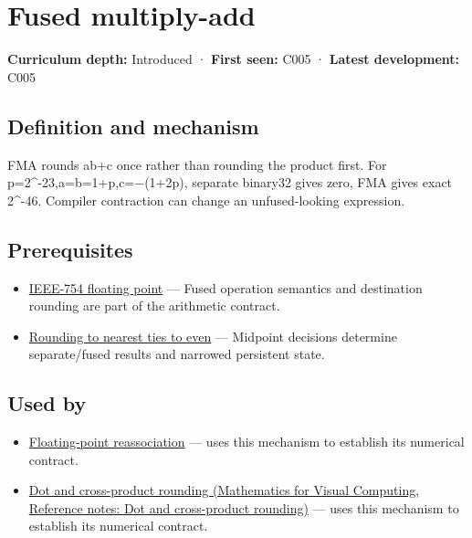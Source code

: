\hypertarget{appendix-41e8ef22a21e}{}\label{referencestart:appendix-41e8ef22a21e}
\section{Fused multiply-add}\label{appendix-41e8ef22a21e-fused-multiply-add}

\textbf{Curriculum depth:} Introduced · \textbf{First seen:} C005 · \textbf{Latest development:} C005

\subsection{Definition and mechanism}\label{appendix-41e8ef22a21e-definition-and-mechanism}

FMA rounds ab+c once rather than rounding the product first. For p=2\^{}-23,a=b=1+p,c=−(1+2p), separate binary32 gives zero, FMA gives exact 2\^{}-46. Compiler contraction can change an unfused-looking expression.

\subsection{Prerequisites}\label{appendix-41e8ef22a21e-prerequisites}

\begin{itemize}
\tightlist
\item
  \hyperref[appendix-343615f49ddf]{IEEE-754 floating point} --- Fused operation semantics and destination rounding are part of the arithmetic contract.
\item
  \hyperref[appendix-614afe1de592]{Rounding to nearest ties to even} --- Midpoint decisions determine separate/fused results and narrowed persistent state.
\end{itemize}

\subsection{Used by}\label{appendix-41e8ef22a21e-used-by}

\begin{itemize}
\tightlist
\item
  \hyperref[appendix-c2ac4a84c283]{Floating-point reassociation} --- uses this mechanism to establish its numerical contract.
\item
  \href{../02-Mathematics-for-Visual-Computing/main.pdf\#nameddest=appendix-5aef4f13483a}{Dot and cross-product rounding (Mathematics for Visual Computing, Reference notes: Dot and cross-product rounding)} --- uses this mechanism to establish its numerical contract.
\end{itemize}

